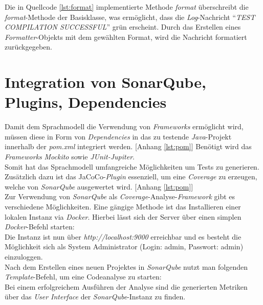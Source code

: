 Die in Quellcode \ref{lst:format} implementierte Methode \textit{format} überschreibt die \textit{format}-Methode der Basisklasse, was ermöglicht, dass die \textit{Log}-Nachricht ``\textit{TEST COMPILATION SUCCESSFUL}'' grün erscheint. Durch das Erstellen eines \textit{Formatter}-Objekts mit dem gewählten Format, wird die Nachricht formatiert zurückgegeben.\\
\vspace{-.3cm}

\section{Integration von SonarQube, Plugins, Dependencies}\label{sec:sonar}
Damit dem Sprachmodell die Verwendung von \textit{Frameworks} ermöglicht wird, müssen diese in Form von \textit{Dependencies} in das zu testende \textit{Java}-Projekt innerhalb der \textit{pom.xml} integriert werden. [Anhang \ref{lst:pom}] Benötigt wird das \textit{Frameworks} \textit{Mockito} sowie \textit{JUnit-Jupiter}.\\
Somit hat das Sprachmodell umfangreiche Möglichkeiten um Tests zu generieren. Zusätzlich dazu ist das JaCoCo-\textit{Plugin} essenziell, um eine \textit{Coverage} zu erzeugen, welche von \textit{SonarQube} ausgewertet wird. [Anhang \ref{lst:pom}]
\\Zur Verwendung von \textit{SonarQube} als \textit{Coverage}-Analyse-\textit{Framework} gibt es verschiedene Möglichkeiten. Eine gängige Methode ist das Installieren einer lokalen Instanz via \textit{Docker}. \cite*{TryOutSonarQube} Hierbei lässt sich der Server über einen simplen \textit{Docker}-Befehl starten:\\[-.2cm]
\vspace{-.3cm} Die Instanz ist nun über \textit{http://localhost:9000} erreichbar und es besteht die Möglichkeit sich als System Administrator (Login: admin, Passwort: admin) einzuloggen.\\ Nach dem Erstellen eines neuen Projektes in \textit{SonarQube} nutzt man folgenden \textit{Template}-Befehl, um eine Codeanalyse zu starten:\\[-.2cm]
\vspace{-.3cm}
Bei einem erfolgreichem Ausführen der Analyse sind die generierten Metriken über das \textit{User Interface} der \textit{SonarQube}-Instanz zu finden.

